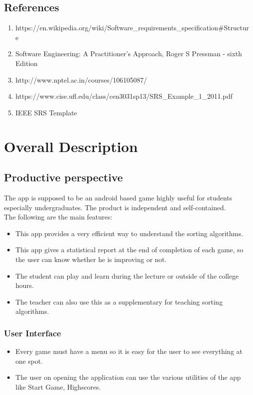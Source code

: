 \documentclass[a4paper,11pt]{article}
\begin{document}
\subsection{References}
\begin{enumerate}
\item https://en.wikipedia.org/wiki/Software\_requirements\_specification\#Structure
\item Software Engineering: A Practitioner's Approach, Roger S Pressman - sixth Edition
\item http://www.nptel.ac.in/courses/106105087/
\item https://www.cise.ufl.edu/class/cen3031sp13/SRS\_Example\_1\_2011.pdf
\item IEEE SRS Template
\end{enumerate}
\section{Overall Description}
\subsection{Productive perspective}
The app is supposed to be an android based game highly useful for students especially undergraduates. The product is independent and self-contained. \\
	The following are the main features:
\begin{itemize}
\item This app provides a very efficient way to understand the sorting algorithms.
\item This app gives a statistical report at the end of completion of each game, so the user can know whether he is improving or not.
\item The student can play and learn during the lecture or outside of the college hours.
\item The teacher can also use this as a supplementary for teaching sorting algorithms.
\end{itemize}
\subsubsection{User Interface}
\begin{itemize}
\item Every game must have a menu so it is easy for the user to see everything at one spot.
\item The user on opening the application can use the various utilities of the app like Start Game, Highscores.
\end{itemize}
\end{document}

